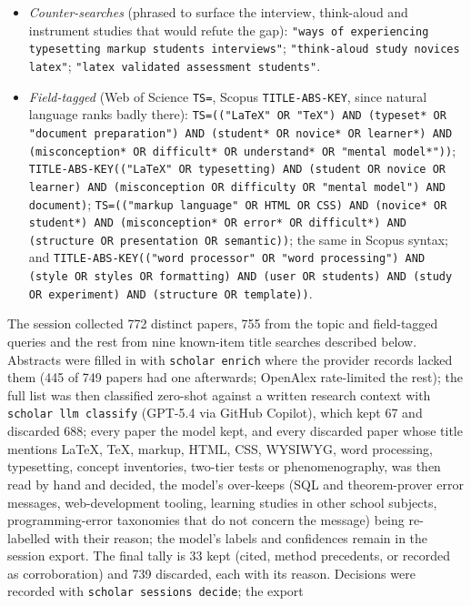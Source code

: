 \begin{itemize}
{    interviews"};
    \texttt{"learning study pre-test post-test critical aspects Marton
    Pang"}.
  \item \emph{Counter-searches} (phrased to surface the interview,
    think-aloud and instrument studies that would refute the gap):
    \texttt{"ways of experiencing typesetting markup students
    interviews"};
    \texttt{"think-aloud study novices latex"};
    \texttt{"latex validated assessment students"}.
  \item \emph{Field-tagged} (Web of Science \texttt{TS=}, Scopus
    \texttt{TITLE-ABS-KEY}, since natural language ranks badly there):
    \texttt{TS=(("LaTeX" OR "TeX") AND (typeset* OR "document
    preparation") AND (student* OR novice* OR learner*) AND
    (misconception* OR difficult* OR understand* OR "mental model*"))};
    \texttt{TITLE-ABS-KEY(("LaTeX" OR typesetting) AND (student OR novice
    OR learner) AND (misconception OR difficulty OR "mental model") AND
    document)};
    \texttt{TS=(("markup language" OR HTML OR CSS) AND (novice* OR
    student*) AND (misconception* OR error* OR difficult*) AND (structure
    OR presentation OR semantic))};
    the same in Scopus syntax;
    and \texttt{TITLE-ABS-KEY(("word processor" OR "word processing")
    AND (style OR styles OR formatting) AND (user OR students) AND (study
    OR experiment) AND (structure OR template))}.
\end{itemize}
The session collected 772 distinct papers, 755 from the topic and
field-tagged queries and the rest from nine known-item title searches
described below.
Abstracts were filled in with \texttt{scholar enrich} where the provider
records lacked them (445 of 749 papers had one afterwards; OpenAlex
rate-limited the rest); the full list was then classified zero-shot
against a written research context with \texttt{scholar llm classify}
(GPT-5.4 via GitHub Copilot), which kept 67 and discarded 688; every
paper the model kept, and every discarded paper whose title mentions
LaTeX, TeX, markup, HTML, CSS, WYSIWYG, word processing, typesetting,
concept inventories, two-tier tests or phenomenography, was then read by
hand and decided, the model's over-keeps (SQL and theorem-prover error
messages, web-development tooling, learning studies in other school
subjects, programming-error taxonomies that do not concern the message)
being re-labelled with their reason; the model's labels and confidences
remain in the session export.
The final tally is 33 kept (cited, method precedents, or recorded as
corroboration) and 739 discarded, each with its reason.
Decisions were recorded with \texttt{scholar sessions decide}; the export
